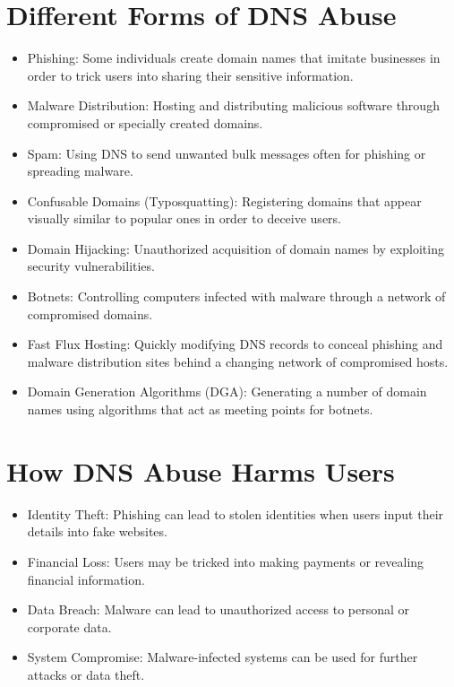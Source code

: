 \section*{Different Forms of DNS Abuse}

\begin{itemize}
    \item Phishing: Some individuals create domain names that imitate businesses in order to trick users into sharing their sensitive information. \cite{webinarcare2023dnsstats}
    \item Malware Distribution: Hosting and distributing malicious software through compromised or specially created domains.
    \item Spam: Using DNS to send unwanted bulk messages often for phishing or spreading malware. \cite{webinarcare2023dnsstats}
    \item Confusable Domains (Typosquatting): Registering domains that appear visually similar to popular ones in order to deceive users. \cite{inta2023dnstypo}
    \item Domain Hijacking: Unauthorized acquisition of domain names by exploiting security vulnerabilities. \cite{inta2023dnstypo}
    \item Botnets: Controlling computers infected with malware through a network of compromised domains.
    \item Fast Flux Hosting: Quickly modifying DNS records to conceal phishing and malware distribution sites behind a changing network of compromised hosts.
    \item Domain Generation Algorithms (DGA): Generating a number of domain names using algorithms that act as meeting points for botnets.
\end{itemize}

\section*{How DNS Abuse Harms Users}

\begin{itemize}
    \item Identity Theft: Phishing can lead to stolen identities when users input their details into fake websites. \cite{godaddy2023dnsabuse}
    \item Financial Loss: Users may be tricked into making payments or revealing financial information. \cite{godaddy2023dnsabuse}
    \item Data Breach: Malware can lead to unauthorized access to personal or corporate data. \cite{icann2022dnsabusetrends}
    \item System Compromise: Malware-infected systems can be used for further attacks or data theft. \cite{dotmagazine2022dnsabuse}
\end{itemize}


